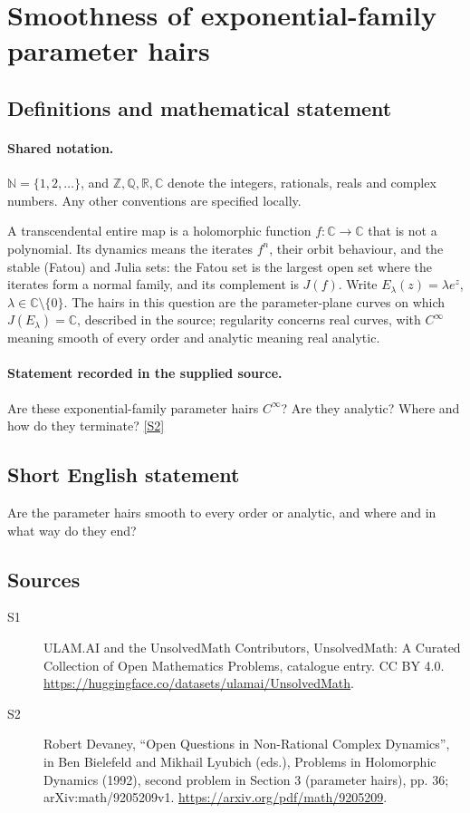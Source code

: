 \documentclass[11pt]{article}
\newcommand{\sref}[2]{\hyperlink{source:#1:#2}{[S#2]}}
\begin{document}
\section{Smoothness of exponential-family parameter hairs}\label{statement}

\subsection{Definitions and mathematical statement}

\paragraph{Shared notation.}$\mathbb N=\{1,2,\ldots\}$, and $\mathbb Z,\mathbb Q,\mathbb R,\mathbb C$ denote the integers, rationals, reals and complex numbers. Any other conventions are specified locally.


A transcendental entire map is a holomorphic function $f:\mathbb C\to\mathbb C$ that is not a polynomial. Its dynamics means the iterates $f^n$, their orbit behaviour, and the stable (Fatou) and Julia sets: the Fatou set is the largest open set where the iterates form a normal family, and its complement is $J(f)$. Write $E_\lambda(z)=\lambda e^z$, $\lambda\in\mathbb C\setminus\{0\}$. The hairs in this question are the parameter-plane curves on which $J(E_\lambda)=\mathbb C$, described in the source; regularity concerns real curves, with $C^\infty$ meaning smooth of every order and analytic meaning real analytic.
\paragraph{Statement recorded in the supplied source.}
Are these exponential-family parameter hairs $C^\infty$? Are they analytic? Where and how do they terminate? \sref{statement}{2}
\subsection{Short English statement}
Are the parameter hairs smooth to every order or analytic, and where and in what way do they end?
\subsection{Sources}
\begin{description}
\item[\hypertarget{source:statement:1}{S1}] ULAM.AI and the UnsolvedMath Contributors, UnsolvedMath: A Curated Collection of Open Mathematics Problems, catalogue entry. CC BY 4.0. \url{https://huggingface.co/datasets/ulamai/UnsolvedMath}.
\item[\hypertarget{source:statement:2}{S2}] Robert Devaney, ``Open Questions in Non-Rational Complex Dynamics'', in Ben Bielefeld and Mikhail Lyubich (eds.), Problems in Holomorphic Dynamics (1992), second problem in Section 3 (parameter hairs), pp. 36; arXiv:math/9205209v1. \url{https://arxiv.org/pdf/math/9205209}.
\end{description}
\label{end:statement}
\end{document}
